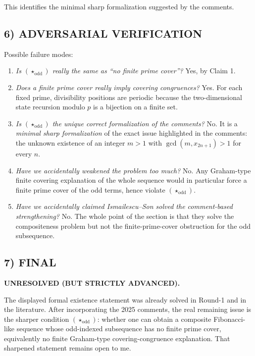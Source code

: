 This identifies the minimal sharp formalization suggested by the comments.

\subsection*{6) ADVERSARIAL VERIFICATION}

Possible failure modes:

\begin{enumerate}
\item \emph{Is $(\star_{\mathrm{odd}})$ really the same as ``no finite prime cover''?}  
Yes, by Claim 1.
\item \emph{Does a finite prime cover really imply covering congruences?}  
Yes.  For each fixed prime, divisibility positions are periodic because the two-dimensional state recursion modulo $p$ is a bijection on a finite set.
\item \emph{Is $(\star_{\mathrm{odd}})$ the unique correct formalization of the comments?}  
No.  It is a \emph{minimal sharp formalization} of the exact issue highlighted in the comments: the unknown existence of an integer $m>1$ with $\gcd(m,x_{2n+1})>1$ for every $n$.
\item \emph{Have we accidentally weakened the problem too much?}  
No.  Any Graham-type finite covering explanation of the whole sequence would in particular force a finite prime cover of the odd terms, hence violate $(\star_{\mathrm{odd}})$.
\item \emph{Have we accidentally claimed Ismailescu--Son solved the comment-based strengthening?}  
No.  The whole point of the section is that they solve the compositeness problem but not the finite-prime-cover obstruction for the odd subsequence.
\end{enumerate}

\subsection*{7) FINAL}

\textbf{UNRESOLVED (BUT STRICTLY ADVANCED).}

The displayed formal existence statement was already solved in Round-1 and in the literature.  After incorporating the 2025 comments, the real remaining issue is the sharper condition $(\star_{\mathrm{odd}})$: whether one can obtain a composite Fibonacci-like sequence whose odd-indexed subsequence has no finite prime cover, equivalently no finite Graham-type covering-congruence explanation.  That sharpened statement remains open to me.

